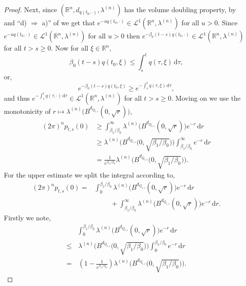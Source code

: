 \documentclass[a4paper, 12pt]{report}
\theoremstyle{cor}
\theoremstyle{remark}
\theoremstyle{definition}
\begin{document}
\begin{proof}
Next, since $(\mathbb{R}^n, d_{q(t_0, \cdot)}, \lambda^{(n)})$ has the volume doubling property, by \cite[Corollary 3.10]{Paper} and ``d) $\Rightarrow$ a)'' of \cite[Proposition 5]{DProofPaper} we get that $e^{-uq(t_0, \cdot)} \in \mathcal{L}^1(\mathbb{R}^n, \lambda^{(n)})$ for all $u > 0$.  Since $e^{-uq(t_0, \cdot)} \in \mathcal{L}^1(\mathbb{R}^n, \lambda^{(n)})$ for all $u > 0$ then $e^{-\beta_0(t - s)q(t_0, \cdot)} \in \mathcal{L}^1(\mathbb{R}^n, \lambda^{(n)})$ for all $t > s \ge 0$.  Now for all $\xi \in \mathbb{R}^n$,
\begin{equation}\label{beta0inequalityproof}
\beta_0(t - s)q(t_0, \xi) \le \int_s^tq(\tau, \xi)\,\mathrm{d}\tau,
\end{equation}
or,
$$
e^{-\beta_0(t - s)q(t_0, \xi)} \ge e^{-\int_s^tq(\tau, \xi)\,\mathrm{d}\tau},
$$
and thus $e^{-\int_s^tq(\tau, \cdot)\,\mathrm{d}\tau} \in \mathcal{L}^1(\mathbb{R}^n, \lambda^{(n)})$ for all $t > s \ge 0$.  Moving on we use the monotonicity of $r \mapsto \lambda^{(n)}\big(B^{d_{Q_{t, s}}}(0, \sqrt{r})\big)$,
\begin{align}
(2\pi)^np_{t, s}(0) & \ge \int_{\beta_1/\beta_0}^\infty\lambda^{(n)}\big(B^{d_{Q_{t, s}}}(0, \sqrt{r})\big)e^{-r}\,\mathrm{d}r\nonumber\\
& \ge \lambda^{(n)}\Big(B^{d_{Q_{t, s}}}\big(0, \sqrt{\beta_1/\beta_0}\big)\Big)\int_{\beta_1/\beta_0}^\infty e^{-r}\,\mathrm{d}r\nonumber\\
& = \frac{1}{e^{\beta_1/\beta_0}}\lambda^{(n)}\Big(B^{d_{Q_{t, s}}}\big(0, \sqrt{\beta_1/\beta_0}\big)\Big).\nonumber
\end{align}
For the upper estimate we split the integral according to,
$$
\begin{aligned}
(2\pi)^np_{t, s}(0) = & \int_0^{\beta_1/\beta_0}\lambda^{(n)}\big(B^{d_{Q_{t, s}}}(0, \sqrt{r})\big)e^{-r}\,\mathrm{d}r\\
& \hspace{1cm} + \int_{\beta_1/\beta_0}^\infty\lambda^{(n)}\big(B^{d_{Q_{t, s}}}(0, \sqrt{r})\big)e^{-r}\,\mathrm{d}r.
\end{aligned}
$$
Firstly we note,
$$
\begin{aligned}
& \int_0^{\beta_1/\beta_0}\lambda^{(n)}\big(B^{d_{Q_{t, s}}}(0, \sqrt{r})\big)e^{-r}\,\mathrm{d}r\\
\le & \, \lambda^{(n)}\Big(B^{d_{Q_{t, s}}}\big(0, \sqrt{\beta_1/\beta_0}\big)\Big)\int_0^{\beta_1/\beta_0}e^{-r}\,\mathrm{d}r\\
= & \, \left(1 - \frac{1}{e^{\beta_1/\beta_0}}\right)\lambda^{(n)}\Big(B^{d_{Q_{t, s}}}\big(0, \sqrt{\beta_1/\beta_0}\big)\Big).

\end{aligned}$$
\end{proof}
\end{document}
